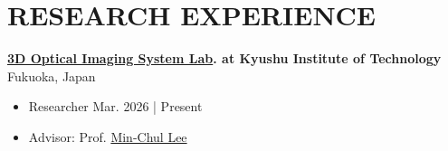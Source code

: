 \documentclass[a4paper,9pt]{extarticle}
\begin{document}

\section*{RESEARCH EXPERIENCE}
\noindent
\textbf{\href{https://leelab.csn.kyutech.ac.jp}{3D Optical Imaging System Lab}. at Kyushu Institute of Technology} \hfill Fukuoka, Japan
\begin{itemize}
    \item Researcher \hfill Mar. 2026 | Present
    \item Advisor: Prof. \href{https://scholar.google.com/citations?user=9sv1-5QAAAAJ&hl=en&oi=ao}{Min-Chul Lee}
\end{itemize}
\end{document}
